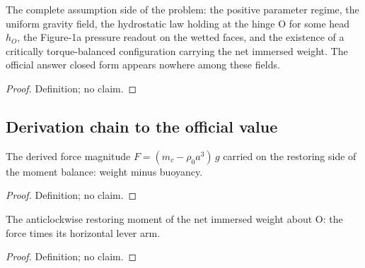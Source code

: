\begin{definition}
\label{def:IPhO2026Problems_problem_IPhO_2026_1_A_1:HydrostaticGateSetup}
The complete assumption side of the problem: the positive parameter regime,
the uniform gravity field, the hydrostatic law holding at the hinge O for
some head $h_O$, the Figure-1a pressure readout on the wetted faces, and the
existence of a critically torque-balanced configuration carrying the net
immersed weight. The official answer closed form appears nowhere among these
fields.
\end{definition}
\begin{proof}
Definition; no claim.
\end{proof}

\subsection*{Derivation chain to the official value}

\begin{definition}
\label{def:IPhO2026Problems_problem_IPhO_2026_1_A_1:netImmersedWeight}
The derived force magnitude $F = (m_c - \rho_0 a^3)\, g$ carried on the
restoring side of the moment balance: weight minus buoyancy.
\end{definition}
\begin{proof}
Definition; no claim.
\end{proof}

\begin{definition}
\label{def:IPhO2026Problems_problem_IPhO_2026_1_A_1:restoringMoment}
The anticlockwise restoring moment of the net immersed weight about O: the
force times its horizontal lever arm.
\end{definition}
\begin{proof}
Definition; no claim.
\end{proof}

